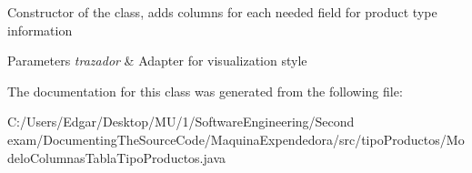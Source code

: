 Constructor of the class, adds columns for each needed field for product type information 
\begin{DoxyParams}{Parameters}
{\em trazador} & Adapter for visualization style \\
\hline
\end{DoxyParams}


The documentation for this class was generated from the following file\+:\begin{DoxyCompactItemize}
\item 
C\+:/\+Users/\+Edgar/\+Desktop/\+M\+U/1/\+Software\+Engineering/\+Second exam/\+Documenting\+The\+Source\+Code/\+Maquina\+Expendedora/src/tipo\+Productos/Modelo\+Columnas\+Tabla\+Tipo\+Productos.\+java\end{DoxyCompactItemize}
